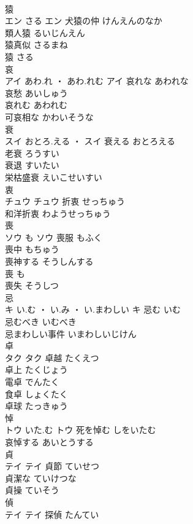 \documentclass[8pt]{extreport}
\begin{document}
\begin{CJK}{UTF8}{min}
\\	猿	
\\	エン	さる	エン	犬猿の仲	けんえんのなか	
\\	類人猿	るいじんえん	
\\	猿真似	さるまね	
\\	猿	さる	
\\	哀	
\\	アイ	あわ.れ ・ あわ.れむ	アイ	哀れな	あわれな	
\\	哀愁	あいしゅう	
\\	哀れむ	あわれむ	
\\	可哀相な	かわいそうな	
\\	衰	
\\	スイ	おとろ.える ・	スイ	衰える	おとろえる	
\\	老衰	ろうすい	
\\	衰退	すいたい	
\\	栄枯盛衰	えいこせいすい	
\\	衷	
\\	チュウ		チュウ	折衷	せっちゅう	
\\	和洋折衷	わようせっちゅう	
\\	喪	
\\	ソウ	も	ソウ	喪服	もふく	
\\	喪中	もちゅう	
\\	喪神する	そうしんする	
\\	喪	も	
\\	喪失	そうしつ	
\\	忌	
\\	キ	い.む ・ い.み ・ い.まわしい	キ	忌む	いむ	
\\	忌むべき	いむべき	
\\	忌まわしい事件	いまわしいじけん	
\\	卓	
\\	タク		タク	卓越	たくえつ	
\\	卓上	たくじょう	
\\	電卓	でんたく	
\\	食卓	しょくたく	
\\	卓球	たっきゅう	
\\	悼	
\\	トウ	いた.む	トウ	死を悼む	しをいたむ	
\\	哀悼する	あいとうする	
\\	貞	
\\	テイ		テイ	貞節	ていせつ	
\\	貞潔な	ていけつな	
\\	貞操	ていそう	
\\	偵	
\\	テイ		テイ	探偵	たんてい	

\end{CJK}
\end{document}
